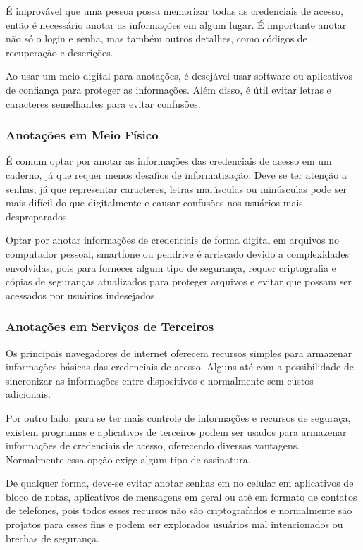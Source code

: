\documentclass[12pt]{article}
\begin{document}
É improvável que uma pessoa possa memorizar todas as credenciais de acesso,
então é necessário anotar as informações em algum lugar.
É importante anotar não só o login e senha, mas também outros detalhes,
como códigos de recuperação e descrições.

Ao usar um meio digital para anotações, é desejável usar software ou
aplicativos de confiança para proteger as informações. Além disso, é útil
evitar letras e caracteres semelhantes para evitar confusões.

\subsubsection{Anotações em Meio Físico}

É comum optar por anotar as informações das credenciais de acesso em um
caderno, já que requer menos desafios de informatização.
Deve se ter atenção a senhas, já que representar caracteres, letras
maiúsculas ou minúsculas pode ser mais difícil do que digitalmente e
causar confusões nos usuários mais despreparados.

Optar por anotar informações de credenciais de forma digital em arquivos
no computador pessoal, smartfone ou pendrive é arriscado devido a
complexidades envolvidas, pois para fornecer algum tipo de segurança,
requer criptografia e cópias de seguranças atualizados para proteger
arquivos e evitar que possam ser acessados por usuários indesejados.

\subsubsection{Anotações em Serviços de Terceiros}

Os principais navegadores de internet oferecem recursos simples para
armazenar informações básicas das credenciais de acesso. Alguns até
com a possibilidade de sincronizar as informações entre dispositivos e
normalmente sem custos adicionais.

Por outro lado, para se ter mais controle de informações e recursos de
seguraça, existem programas e aplicativos de terceiros podem ser usados
para armazenar informações de credenciais de acesso, oferecendo diversas
vantagens. Normalmente essa opção exige algum tipo de assinatura.

De qualquer forma, deve-se evitar anotar senhas em no celular em
aplicativos de bloco de notas, aplicativos de mensagens em geral ou até
em formato de contatos de telefones, pois todos esses recursos não são
criptografados e normalmente são projatos para esses fins e podem ser
explorados usuários mal intencionados ou brechas de segurança.
\end{document}
